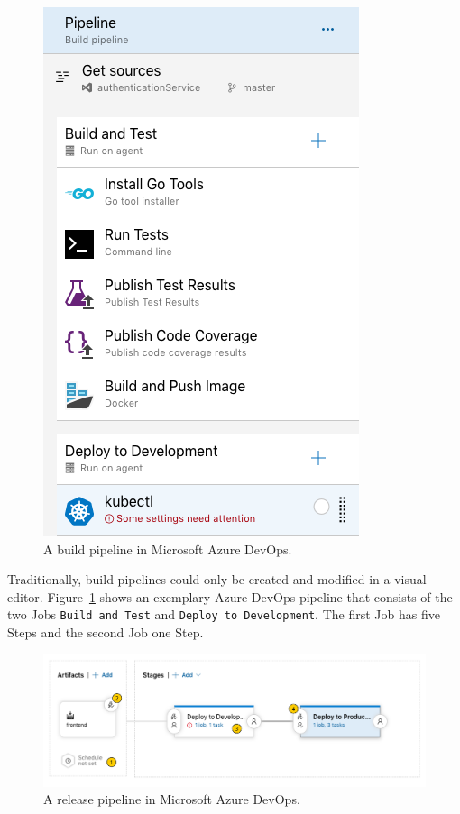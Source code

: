 \begin{figure}[H]
\begin{center}
  \includegraphics[scale=0.6]{images/figures/azure_devops_build_pipeline.png}
\end{center}
\caption{A build pipeline in Microsoft Azure DevOps.}%
\label{fig:build_pipeline_azure}
\end{figure}

Traditionally, build pipelines could only be created and modified in a visual
editor. Figure~\ref{fig:build_pipeline_azure} shows an exemplary Azure DevOps
pipeline that consists of the two Jobs \texttt{Build and Test} and
\texttt{Deploy to Development}. The first Job has five Steps and the second Job
one Step.

\begin{figure}[H]
\begin{center}
  \includegraphics[scale=0.5]{images/figures/azure_devops_release_pipeline_base.pdf}
\end{center}
\caption{A release pipeline in Microsoft Azure DevOps.}%
\label{fig:release_pipeline_azure}
\end{figure}


